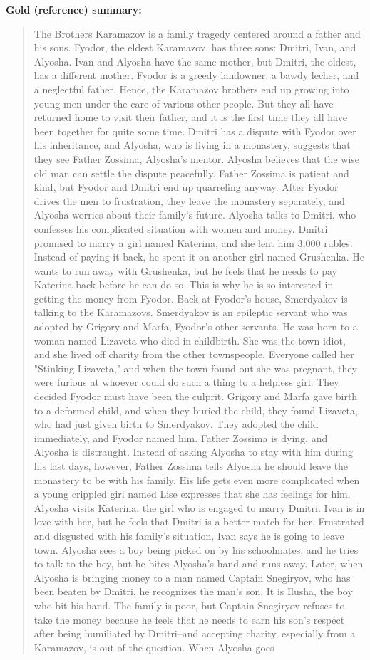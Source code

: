 \documentclass{article}
\begin{document}
\textbf{Gold (reference) summary:}
\begin{quote}
The Brothers Karamazov is a family tragedy centered around a father and his sons. Fyodor, the eldest Karamazov, has three sons: Dmitri, Ivan, and Alyosha. Ivan and Alyosha have the same mother, but Dmitri, the oldest, has a different mother. Fyodor is a greedy landowner, a bawdy lecher, and a neglectful father. Hence, the Karamazov brothers end up growing into young men under the care of various other people. But they all have returned home to visit their father, and it is the first time they all have been together for quite some time. Dmitri has a dispute with Fyodor over his inheritance, and Alyosha, who is living in a monastery, suggests that they see Father Zossima, Alyosha's mentor. Alyosha believes that the wise old man can settle the dispute peacefully. Father Zossima is patient and kind, but Fyodor and Dmitri end up quarreling anyway. After Fyodor drives the men to frustration, they leave the monastery separately, and Alyosha worries about their family's future. Alyosha talks to Dmitri, who confesses his complicated situation with women and money. Dmitri promised to marry a girl named Katerina, and she lent him 3,000 rubles. Instead of paying it back, he spent it on another girl named Grushenka. He wants to run away with Grushenka, but he feels that he needs to pay Katerina back before he can do so. This is why he is so interested in getting the money from Fyodor. Back at Fyodor's house, Smerdyakov is talking to the Karamazovs. Smerdyakov is an epileptic servant who was adopted by Grigory and Marfa, Fyodor's other servants. He was born to a woman named Lizaveta who died in childbirth. She was the town idiot, and she lived off charity from the other townspeople. Everyone called her "Stinking Lizaveta," and when the town found out she was pregnant, they were furious at whoever could do such a thing to a helpless girl. They decided Fyodor must have been the culprit. Grigory and Marfa gave birth to a deformed child, and when they buried the child, they found Lizaveta, who had just given birth to Smerdyakov. They adopted the child immediately, and Fyodor named him. Father Zossima is dying, and Alyosha is distraught. Instead of asking Alyosha to stay with him during his last days, however, Father Zossima tells Alyosha he should leave the monastery to be with his family. His life gets even more complicated when a young crippled girl named Lise expresses that she has feelings for him. Alyosha visits Katerina, the girl who is engaged to marry Dmitri. Ivan is in love with her, but he feels that Dmitri is a better match for her. Frustrated and disgusted with his family's situation, Ivan says he is going to leave town. Alyosha sees a boy being picked on by his schoolmates, and he tries to talk to the boy, but he bites Alyosha's hand and runs away. Later, when Alyosha is bringing money to a man named Captain Snegiryov, who has been beaten by Dmitri, he recognizes the man's son. It is Ilusha, the boy who bit his hand. The family is poor, but Captain Snegiryov refuses to take the money because he feels that he needs to earn his son's respect after being humiliated by Dmitri--and accepting charity, especially from a Karamazov, is out of the question. When Alyosha goes 
\end{quote}
\end{document}
